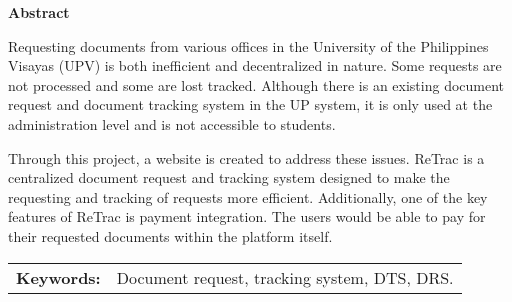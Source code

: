 \begin{center}
\textbf{Abstract}
\end{center}
\setlength{\parindent}{0pt}
Requesting documents from various offices in the University of the Philippines Visayas (UPV) is both inefficient and decentralized in nature. Some requests are not processed and some are lost tracked. Although there is an existing document request and document tracking system in the UP system, it is only used at the administration level and is not accessible to students. 

Through this project, a website is created to address these issues. ReTrac is a centralized document request and tracking system designed to make the requesting and tracking of requests more efficient. Additionally, one of the key features of ReTrac is payment integration. The users would be able to pay for their requested documents within the platform itself. 



\begin{tabular}{lp{4.25in}}
\hspace{-0.5em}\textbf{Keywords:}\hspace{0.25em} & Document request, tracking system, DTS, DRS.\\
\end{tabular}
